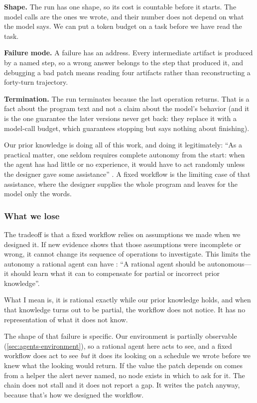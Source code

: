\item \textbf{Shape.} The run has one shape, so its cost is countable before it starts. The model calls are the ones we wrote, and their number does not depend on what the model says. We can put a token budget on a task
before we have read the task.

\item \textbf{Failure mode.} A failure has an address. Every intermediate artifact is produced by a named step, so a wrong
answer belongs to the step that produced it, and debugging a bad patch means reading four
artifacts rather than reconstructing a forty-turn trajectory.

\item \textbf{Termination.} The run terminates because the last operation returns. That is a fact about the program text and
not a claim about the model's behavior (and it is the one guarantee the later versions never get
back: they replace it with a model-call budget, which guarantees stopping but says nothing about
finishing).

\ei

Our prior knowledge is doing all of this work, and doing it legitimately: ``As a practical matter,
one seldom requires complete autonomy from the start: when the agent has had little or no
experience, it would have to act randomly unless the designer gave some assistance''
\citep[\S2.2.3]{russell2020aima}. A fixed workflow is the limiting case of that assistance, where
the designer supplies the whole program and leaves for the model only the words.

\subsubsection{What we lose}
The tradeoff is that a fixed workflow relies on assumptions we made when we designed it.
If new evidence shows that those assumptions were incomplete or wrong, it cannot change its
sequence of operations to investigate. This limits the autonomy a rational agent can have \citep[\S2.2.3]{russell2020aima}:
``A rational agent should be autonomous---it should learn what it can to compensate for partial or incorrect prior knowledge''.

What I mean is, it is rational exactly while our prior knowledge holds, and when that knowledge
turns out to be partial, the workflow does not notice. It has no representation of what it does
not know.

The shape of that failure is specific. Our environment is partially observable (\cref{sec:agents-environment}), 
so a rational agent here acts to see, and a fixed workflow does act to see \textit{but} it does its looking on a schedule we wrote before we knew 
what the looking would return. If the value the patch depends on comes from a helper the alert never named, no node exists in which to ask for it. 
The chain does not stall and it does not report a gap. It writes the patch anyway, because that's how we designed the workflow.

